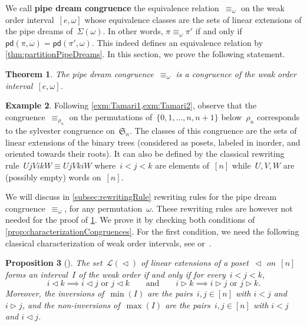 \documentclass{amsart}
\newtheorem{theorem}{Theorem}[section]
\newtheorem{proposition}[theorem]{Proposition}
\theoremstyle{definition}
\newtheorem{example}[theorem]{Example}
\newcommand{\defn}[1]{\textbf{\textsf{\color{PineGreen} #1}}} %
\newcommand{\fS}{\mathfrak{S}} %
\newcommand{\acyclicPipeDreams}{\Sigma} %
\newcommand{\linearExtensions}{\mathcal{L}} %
\newcommand{\insertion}[2]{\mathsf{pd}(#1,#2)} %
\newcommand{\less}{\vartriangleleft} %
\newcommand{\more}{\vartriangleright} %
\begin{document}
We call \defn{pipe dream congruence} the equivalence relation~$\equiv_\omega$ on the weak order interval~$[e,\omega]$ whose equivalence classes are the sets of linear extensions of the pipe dreams of~$\acyclicPipeDreams(\omega)$.
In other words, $\pi \equiv_\omega \pi'$ if and only if~$\insertion{\pi}{\omega} = \insertion{\pi'}{\omega}$.
This indeed defines an equivalence relation by \cref{thm:partitionPipeDreams}.
In this section, we prove the following statement.

\begin{theorem}
\label{thm:pipeDreamCongruence}
The pipe dream congruence~$\equiv_\omega$ is a congruence of the weak order interval~$[e,\omega]$.
\end{theorem}

\begin{example}
\label{exm:Tamari3}
Following \cref{exm:Tamari1,exm:Tamari2}, observe that the congruence~$\equiv_{\rho_n}$ on the permutations of~$\{0, 1, \dots, n, n+1\}$ below~$\rho_n$ corresponds to the sylvester congruence on~$\fS_n$.
The classes of this congruence are the sets of linear extensions of the binary trees (considered as posets, labeled in inorder, and oriented towards their roots).
It can also be defined by the classical rewriting rule~$UjVikW \equiv UjVkiW$ where~$i < j < k$ are elements of~$[n]$ while~$U, V, W$ are (possibly empty) words on~$[n]$.
\end{example}

We will discuss in \cref{subsec:rewritingRule} rewriting rules for the pipe dream congruence~$\equiv_\omega$, for any permutation~$\omega$.
These rewriting rules are however not needed for the proof of \cref{thm:pipeDreamCongruence}.
We prove it by checking both conditions of \cref{prop:characterizationCongruences}.
For the first condition, we need the following classical characterization of weak order intervals, see \cite{BjornerWachs} or~\cite{ChatelPilaudPons}.

\begin{proposition}[{\cite[Thm.~6.8]{BjornerWachs}}]
\label{prop:WOIP}
The set~$\linearExtensions(\less)$ of linear extensions of a poset~$\less$ on~$[n]$ forms an interval~$I$ of the weak order if and only if for every~$i < j < k$,
\[
i \less k \implies i \less j \text{ or } j \less k
\qquad\text{and}\qquad
i \more k \implies i \more j \text{ or } j \more k.
\]
Moreover, the inversions of~$\min(I)$ are the pairs~$i,j \in [n]$ with $i < j$ and $i \more j$, and the non-inversions of~$\max(I)$ are the pairs~$i,j \in [n]$ with $i < j$ and $i \less j$.
\end{proposition}
\end{document}
